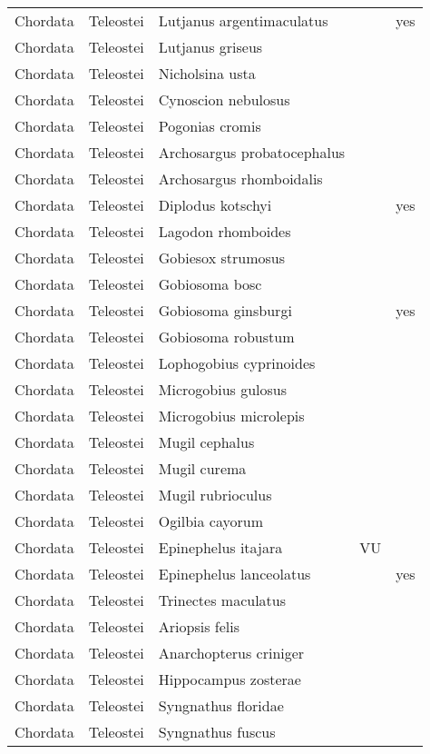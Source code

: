 \begin{longtable}{lllll}
  Chordata & Teleostei & Lutjanus argentimaculatus &  & yes \\ 
  Chordata & Teleostei & Lutjanus griseus &  &  \\ 
  Chordata & Teleostei & Nicholsina usta &  &  \\ 
  Chordata & Teleostei & Cynoscion nebulosus &  &  \\ 
  Chordata & Teleostei & Pogonias cromis &  &  \\ 
  Chordata & Teleostei & Archosargus probatocephalus &  &  \\ 
  Chordata & Teleostei & Archosargus rhomboidalis &  &  \\ 
  Chordata & Teleostei & Diplodus kotschyi &  & yes \\ 
  Chordata & Teleostei & Lagodon rhomboides &  &  \\ 
  Chordata & Teleostei & Gobiesox strumosus &  &  \\ 
  Chordata & Teleostei & Gobiosoma bosc &  &  \\ 
  Chordata & Teleostei & Gobiosoma ginsburgi &  & yes \\ 
  Chordata & Teleostei & Gobiosoma robustum &  &  \\ 
  Chordata & Teleostei & Lophogobius cyprinoides &  &  \\ 
  Chordata & Teleostei & Microgobius gulosus &  &  \\ 
  Chordata & Teleostei & Microgobius microlepis &  &  \\ 
  Chordata & Teleostei & Mugil cephalus &  &  \\ 
  Chordata & Teleostei & Mugil curema &  &  \\ 
  Chordata & Teleostei & Mugil rubrioculus &  &  \\ 
  Chordata & Teleostei & Ogilbia cayorum &  &  \\ 
  Chordata & Teleostei & Epinephelus itajara & VU &  \\ 
  Chordata & Teleostei & Epinephelus lanceolatus &  & yes \\ 
  Chordata & Teleostei & Trinectes maculatus &  &  \\ 
  Chordata & Teleostei & Ariopsis felis &  &  \\ 
  Chordata & Teleostei & Anarchopterus criniger &  &  \\ 
  Chordata & Teleostei & Hippocampus zosterae &  &  \\ 
  Chordata & Teleostei & Syngnathus floridae &  &  \\ 
  Chordata & Teleostei & Syngnathus fuscus &  &  \\ 

\end{longtable}
